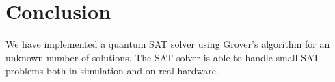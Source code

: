 \section{Conclusion}\label{sec:conclusion}

We have implemented a quantum SAT solver using Grover's algorithm for an unknown number of solutions.
The SAT solver is able to handle small SAT problems both in simulation and on real hardware.
